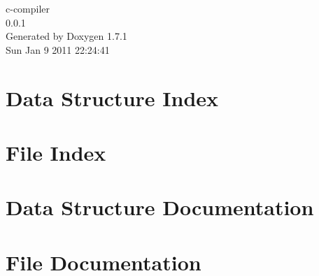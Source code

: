 \documentclass[a4paper]{book}
\begin{document}
\hypersetup{pageanchor=false}
\begin{titlepage}
\vspace*{7cm}
\begin{center}
{\Large c-\/compiler \\[1ex]\large 0.0.1 }\\
\vspace*{1cm}
{\large Generated by Doxygen 1.7.1}\\
\vspace*{0.5cm}
{\small Sun Jan 9 2011 22:24:41}\\
\end{center}
\end{titlepage}
\clearemptydoublepage
{}
\tableofcontents
\clearemptydoublepage
{}
\hypersetup{pageanchor=true}
\chapter{Data Structure Index}

\chapter{File Index}

\chapter{Data Structure Documentation}


\chapter{File Documentation}


















\printindex
\end{document}
